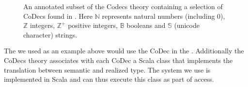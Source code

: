 \begin{figure}[ht]\centering
  \caption[List of Codecs]{
    An annotated subset of the Codecs theory containing a selection of CoDecs found in \mmt. 
    Here $\mathbb{N}$ represents natural numbers (including $0$), 
    $\mathbb{Z}$ integers, 
    $\mathbb{Z}^{+}$ positive integers, 
    $\mathbb{B}$ booleans and
    $\mathbb{S}$ (unicode character) strings. 
  }
  \label{fig:codecs}
\end{figure}
The  we used as an example above would use the  CoDec in the \lmfdb. 
Additionally the \textsf{CoDecs} theory associates with each CoDec a Scala class that implements the translation between semantic and realized type. The \mmt system we use is implemented in Scala and can thus execute this class as part of \lmfdb access. 

